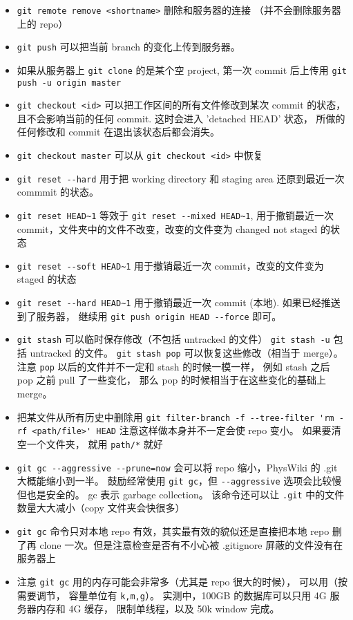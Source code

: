 \begin{itemize}
\item \verb|git remote remove <shortname>| 删除和服务器的连接 （并不会删除服务器上的 repo）
\item \verb|git push| 可以把当前 branch 的变化上传到服务器。
\item 如果从服务器上 \verb|git clone| 的是某个空 project, 第一次 commit 后上传用 \verb|git push -u origin master|
\item \verb|git checkout <id>| 可以把工作区间的所有文件修改到某次 commit 的状态， 且不会影响当前的任何 commit. 这时会进入 'detached HEAD' 状态， 所做的任何修改和 commit 在退出该状态后都会消失。
\item \verb|git checkout master| 可以从 \verb|git checkout <id>| 中恢复
\item \verb|git reset --hard| 用于把 working directory 和 staging area 还原到最近一次 commmit 的状态。
\item \verb|git reset HEAD~1| 等效于 \verb|git reset --mixed HEAD~1|, 用于撤销最近一次 commit，文件夹中的文件不改变，改变的文件变为 changed not staged 的状态
\item \verb|git reset --soft HEAD~1| 用于撤销最近一次 commit，改变的文件变为 staged 的状态
\item \verb|git reset --hard HEAD~1| 用于撤销最近一次 commit (本地). 如果已经推送到了服务器， 继续用 \verb|git push origin HEAD --force| 即可。
\item \verb|git stash| 可以临时保存修改（不包括 untracked 的文件） \verb|git stash -u| 包括 untracked 的文件。 \verb|git stash pop| 可以恢复这些修改（相当于 merge）。 注意 \verb|pop| 以后的文件并不一定和 stash 的时候一模一样， 例如 stash 之后 pop 之前 pull 了一些变化， 那么 pop 的时候相当于在这些变化的基础上 merge。
\item 把某文件从所有历史中删除用 \verb|git filter-branch -f --tree-filter 'rm -rf <path/file>' HEAD| 注意这样做本身并不一定会使 repo 变小。 如果要清空一个文件夹， 就用 \verb|path/*| 就好
\item \verb|git gc --aggressive --prune=now| 会可以将 repo 缩小，PhysWiki 的 .git 大概能缩小到一半。 鼓励经常使用 \verb|git gc|，但 \verb|--aggressive| 选项会比较慢但也是安全的。 gc 表示 garbage collection。 该命令还可以让 \verb|.git| 中的文件数量大大减小（copy 文件夹会快很多）
\item \verb|git gc| 命令只对本地 repo 有效，其实最有效的貌似还是直接把本地 repo 删了再 clone 一次。但是注意检查是否有不小心被 .gitignore 屏蔽的文件没有在服务器上
\item 注意 \verb|git gc| 用的内存可能会非常多（尤其是 repo 很大的时候）， 可以用（按需要调节， 容量单位有 \verb|k,m,g|）。 实测中，100GB 的数据库可以只用 4G 服务器内存和 4G 缓存， 限制单线程，以及 50k window 完成。

\end{itemize}
